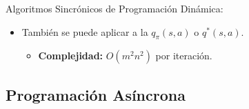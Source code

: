\documentclass[10pt, envcountsect, handout, aspectratio=1610, hyperref={hypertexnames=true}]{beamer}
\begin{document}
\begin{frame}{Algoritmos Sincrónicos de Programación Dinámica:}
\begin{itemize}
\begin{itemize}
\begin{itemize}
					\item[]\qquad - Operaciones por estado \(s\): $ m \cdot \left[ O(1) + \underbrace{n}_{\text{suma sobre } s'} \right] = O(mn). $
					\item[]\qquad - Operaciones para todos los estados: $n \cdot O(mn) = O(mn^2).$

			
					\item \underline{\textit{Iteración de Valores:}}
					$
					v^*(s) = \max_{a \in A} \left[ R_s^a + \gamma \sum_{s' \in S} P_{ss'}^a v^*(s') \right].
					$
				
					\item[]\qquad - Operaciones por estado \(s\): $\underbrace{m \cdot (O(1) + O(n))}_{\text{evaluar todas las acciones}} + \underbrace{O(m)}_{\text{calcular el máximo}} = O(mn).$
					\item[]\qquad - Total para todos los estados: $n \cdot O(mn) = O(mn^2) \quad \text{por iteración}.$
				\end{itemize}
				
				
			\end{itemize}
		
		\item También se puede aplicar a la  $q_\pi(s,a)$ o $q^*(s,a)$.
			\begin{itemize}
				\item \textbf{Complejidad:} $O(m^2n^2)$ por iteración.
			\end{itemize}
	\end{itemize}


\end{frame}





%

\subsection{Programación Asíncrona}
\end{document}
